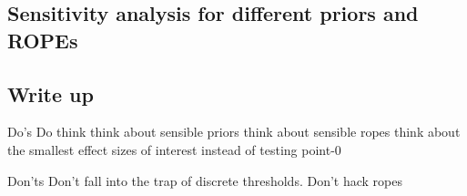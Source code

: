 \documentclass[
  jou,
  longtable,
  nolmodern,
  notxfonts,
  notimes,
  colorlinks=true,linkcolor=blue,citecolor=blue,urlcolor=blue]{apa7}
\begin{document}
\subsection{Sensitivity analysis for different priors and
ROPEs}\label{sensitivity-analysis-for-different-priors-and-ropes}

\subsection{Write up}\label{write-up}

Do's Do think think about sensible priors think about sensible ropes
think about the smallest effect sizes of interest instead of testing
point-0

Don'ts Don't fall into the trap of discrete thresholds. Don't hack ropes
\end{document}
